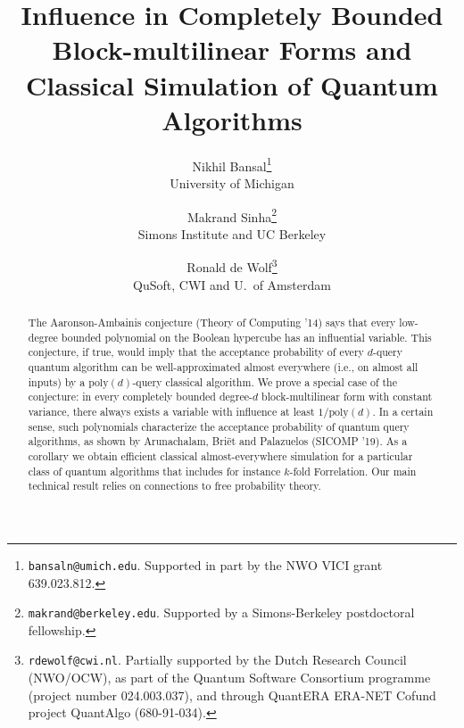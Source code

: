 \documentclass[english,11pt]{article}
\date{}
\theoremstyle{plain}
\theoremstyle{plain}
\theoremstyle{remark}
\newcommand{\poly}{\mathrm{poly}}
\begin{document}
\title{Influence in Completely Bounded Block-multilinear Forms and Classical Simulation of Quantum Algorithms}
\author{ Nikhil Bansal\thanks{\texttt{bansaln@umich.edu}. Supported in part by the NWO VICI grant 639.023.812.}\\ \small University of Michigan \and
 Makrand Sinha\thanks{\texttt{makrand@berkeley.edu}. Supported by a Simons-Berkeley postdoctoral fellowship.}\\ \small Simons Institute and UC Berkeley \and 
 Ronald de Wolf\thanks{\texttt{rdewolf@cwi.nl}. Partially supported by the Dutch Research Council (NWO/OCW), as part of the Quantum Software Consortium programme (project number 024.003.037), and through QuantERA ERA-NET Cofund project QuantAlgo (680-91-034).}\\ \small{QuSoft, CWI and U.\ of Amsterdam}
}

\maketitle
\begin{abstract}
The Aaronson-Ambainis conjecture (Theory of Computing '14) says that every low-degree bounded polynomial on the Boolean hypercube has an influential variable. This conjecture, if true, would imply that the acceptance probability of every $d$-query quantum algorithm can be well-approximated almost everywhere (i.e., on almost all inputs) by a $\poly(d)$-query classical algorithm.
We prove a special case of the conjecture: in every completely bounded  degree-$d$ block-multilinear form with constant variance, there always exists a variable with influence at least $1/\poly(d)$. In a certain sense, such polynomials characterize the acceptance probability of quantum query algorithms, as shown by Arunachalam, Bri\"et and Palazuelos (SICOMP '19). As a corollary we obtain efficient classical almost-everywhere simulation for a particular class of quantum algorithms that includes for instance $k$-fold Forrelation.
Our main technical result relies on connections to free probability theory.
\end{abstract}


\thispagestyle{empty}
\clearpage
\newpage
\setcounter{page}{1}

\allowdisplaybreaks















\appendix

\end{document}
